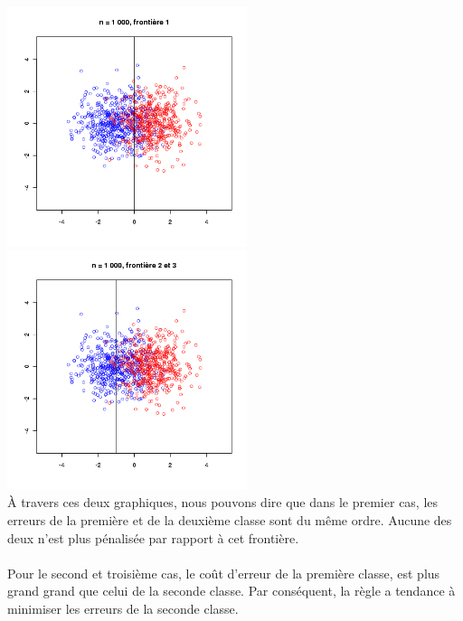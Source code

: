 \documentclass[a4paper, 10pt]{article}
\begin{document}
\newpage
\noindent
\includegraphics[height = 7cm, width = 7cm]{plots/plot_frontiere_1.png}
\includegraphics[height = 7cm, width = 7cm]{plots/plot_frontiere_2.png}\\
À travers ces deux graphiques, nous pouvons dire que dans le premier cas, les erreurs de la première et de la deuxième classe sont du même ordre.
Aucune des deux n'est plus pénalisée par rapport à cet frontière.\\ \\
Pour le second et troisième cas, le coût d'erreur de la première classe, est plus grand grand que celui de la seconde classe.
Par conséquent, la règle a tendance à minimiser les erreurs de la seconde classe.\\ \\
\end{document}
